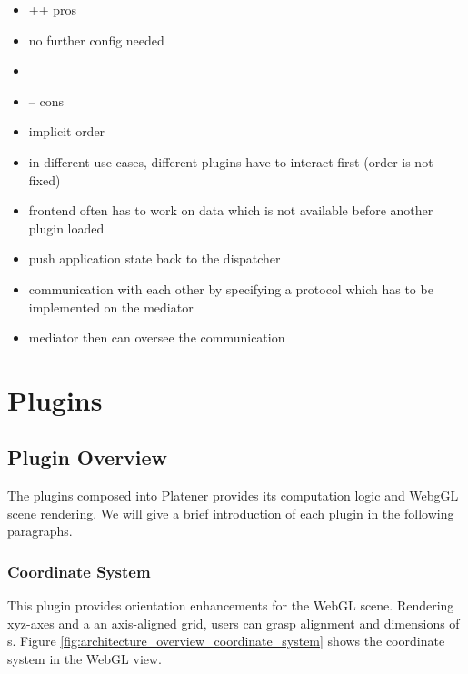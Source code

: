 \documentclass[../ClassicThesis.tex]{subfiles}
\begin{document}
\begin{itemize}
\item ++ pros
\item no further config needed
\item
\item -- cons
\item implicit order
\item in different use cases, different plugins have to interact first (order is
  not fixed)
\item frontend often has to work on data which is not available before another
  plugin loaded
\end{itemize}


\begin{itemize}
\item push application state back to the dispatcher
\item communication with each other by specifying a protocol which has to be
  implemented on the mediator
\item mediator then can oversee the communication
\end{itemize}

\section{Plugins}

\subsection{Plugin Overview}


The plugins composed into Platener provides its computation logic and WebgGL
scene rendering. We will give a brief introduction of each plugin in the
following paragraphs.

\subsubsection{Coordinate System}

This plugin provides orientation enhancements for the WebGL scene. Rendering
xyz-axes and a an axis-aligned grid, users can grasp alignment and dimensions of
{\threedmodel}s. Figure \ref{fig:architecture_overview_coordinate_system} shows
the coordinate system in the WebGL view.
\end{document}
